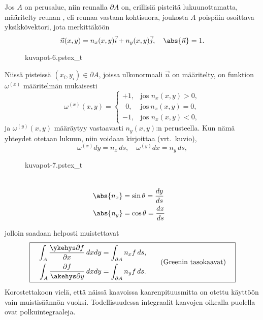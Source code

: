 Jos $A$ on perusalue, niin reunalla $\partial A$ on, erillisiä pisteitä lukuunottamatta, 
%
määritelty reunan , eli reunaa vastaan kohtisuora, joukosta $A$ poispäin
osoittava yksikkövektori, jota merkittäköön
\[
\vec n(x,y)=n_x(x,y)\vec i+n_y(x,y)\vec j,\quad \abs{\vec n}=1.
\]
\begin{figure}[H]
\begin{center}
{kuvapot-6.pstex_t}
\end{center}
\end{figure}
Niissä pisteissä $(x_i,y_i)\in\partial A$, joissa ulkonormaali $\vec n$ on määritelty, on
funktion $\omega^{(x)}$ määritelmän mukaisesti
\[
\omega^{(x)}(x,y) = \begin{cases} 
                      +1,     &\text{jos } n_x(x,y)>0, \\ 
                      \ \ 0,  &\text{jos}\ n_x(x,y)=0, \\
                      -1,     &\text{jos } n_x(x,y)<0,
                    \end{cases} 
\]
ja $\omega^{(y)}(x,y)$ määräytyy vastaavasti $n_y(x,y)$:n perusteella. Kun nämä yhteydet otetaan
lukuun, niin voidaan kirjoittaa (vrt.\ kuvio),
\[
\omega^{(x)}dy=n_x\,ds,\quad \omega^{(y)}dx=n_y\,ds,
\]
\begin{multicols}{2} \raggedcolumns
\begin{figure}[H]
\begin{center}
{kuvapot-7.pstex_t}
\end{center}
\end{figure}
\begin{align*}
\\
\abs{n_x} &= \sin\theta=\frac{dy}{ds} \\
\abs{n_y} &= \cos\theta=\frac{dx}{ds}
\end{align*}
\end{multicols}
%
jolloin saadaan helposti muistettavat 
\[
\boxed{\begin{aligned}
\quad \int_A \frac{\ykehys\partial f}{\partial x}\,dxdy &= \int_{\partial A} n_xf\,ds, \\
      \int_A \frac{\partial f}{\akehys\partial y}\,dxdy &= \int_{\partial A} n_yf\,ds.
\end{aligned} \qquad \text{(Greenin tasokaavat)}\quad }
\]
Korostettakoon vielä, että näissä kaavoissa kaarenpituusmitta on otettu käyttöön vain
muistisäännön vuoksi. Todellisuudessa integraalit kaavojen oikealla puolella ovat
polkuintegraaleja.

